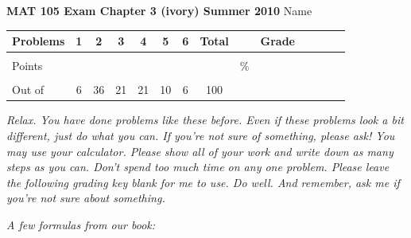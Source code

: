 \documentclass[12pt]{article}
\begin{document}
{\bf MAT 105 Exam Chapter 3 (ivory) Summer 2010} \hspace{.4in} {\large Name} \hrulefill

\hrulefill


\begin{center}

\begin{tabular}
{|l|c|c|c|c|c|c|c|c|c|c|c|c|c|} \hline

 Problems & \hspace{5 pt} 1 \hspace{5 pt}  & \hspace{5 pt} 2 \hspace{5 pt} & \hspace{5 pt} 3 \hspace{5 pt} & \hspace{5 pt} 4 \hspace{5 pt} & \hspace{5 pt} 5 \hspace{5 pt} &  \hspace{5 pt} 6 \hspace{5 pt} &  \hspace{5 pt} Total  \hspace{5 pt} & &  \hspace{5 pt} Grade \hspace{5 pt}  \\ \hline
&&&&&&& &&\\  
Points &&&&&&& &    \hspace{.8in}\% &  \\ 
&&&&&& &&& \\  \hline
Out of & 6 & 36  & 21 & 21 & 10 & 6 &100 & & \\ \hline

\end {tabular}
 
\end{center}

\emph{Relax.  You have done problems like these before.  Even if these problems look a bit different, just do what you can.  If you're not sure of something, please ask! You may use your calculator.  Please show all of your work and write down as many steps as you can.  Don't spend too much time on any one problem.  Please leave the following grading key blank for me to use.  Do well.  And remember, ask me if you're not sure about something.}
 
 \vspace{.1 in}
 
 \emph{A few formulas from our book:}
  \vspace{.2in}
 
\end{document}
